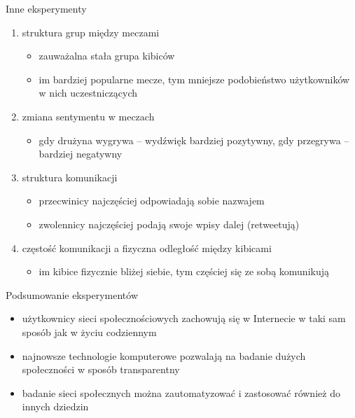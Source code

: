\documentclass[xcolor=table]{beamer}
\begin{document}
\begin{frame}{Inne eksperymenty}
\begin{enumerate}
  \item struktura grup między meczami
  \begin{itemize}
    \item zauważalna stała grupa kibiców
    \item im bardziej popularne mecze, tym mniejsze podobieństwo użytkowników
    w nich uczestniczących 
  \end{itemize}
  \item zmiana sentymentu w meczach
  \begin{itemize}
    \item gdy drużyna wygrywa -- wydźwięk bardziej pozytywny, gdy przegrywa --
    bardziej negatywny
  \end{itemize}
  \item struktura komunikacji
  \begin{itemize}
    \item przecwinicy najczęściej odpowiadają sobie nazwajem
    \item zwolennicy najczęściej podają swoje wpisy dalej (retweetują)
  \end{itemize}
  \item częstość komunikacji a fizyczna odległość między kibicami
  \begin{itemize}
    \item im kibice fizycznie bliżej siebie, tym częściej się ze sobą komunikują
  \end{itemize} 
   
\end{enumerate}
\end{frame}
\begin{frame}{Podsumowanie eksperymentów}
\begin{itemize}
  \item użytkownicy sieci społecznościowych zachowują się w Internecie w taki
  sam sposób jak w życiu codziennym
  \item najnowsze technologie komputerowe pozwalają na badanie dużych
  społeczności w sposób transparentny
  \item badanie sieci społecznych można zautomatyzować i zastosować również do
  innych dziedzin 
\end{itemize}
\end{frame}
\end{document}

